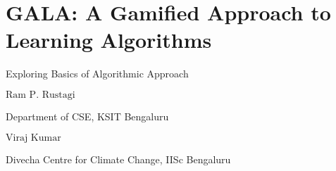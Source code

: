 \chapter{GALA: A Gamified Approach to Learning Algorithms}

\vskip -12pt

\centerline{{\LARGE Exploring Basics of Algorithmic Approach}}

\vskip 0.8cm

\begin{center}
{\large\uppercase{$\text{Ram P. Rustagi}$}} 

\vskip -6pt

Department of CSE, KSIT Bengaluru

\end{center}

\vskip 1cm

\begin{center}
{\large\uppercase{$\text{Viraj Kumar}$}} 

\vskip -6pt

Divecha Centre for Climate Change, IISc Bengaluru

\end{center}



\vfill




\newpage

